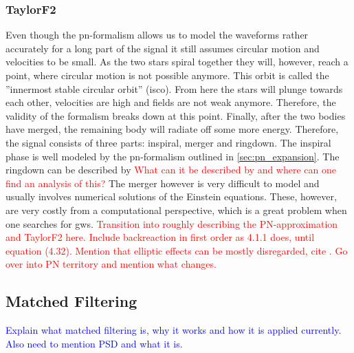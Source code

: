 \subsubsection{TaylorF2}
Even though the \gls{pn}-formalism allows us to model the waveforms rather accurately for a long part of the signal it still assumes circular motion and velocities to be small. As the two stars spiral together they will, however, reach a point, where circular motion is not possible anymore. This orbit is called the ''innermost stable circular orbit'' (\gls{isco}). From here the stars will plunge towards each other, velocities are high and fields are not weak anymore. Therefore, the validity of the formalism breaks down at this point. Finally, after the two bodies have merged, the remaining body will radiate off some more energy. Therefore, the signal consists of three parts: inspiral, merger and ringdown. The inspiral phase is well modeled by the \gls{pn}-formalism outlined in \autoref{sec:pn_expansion}. The ringdown can be described by \textcolor{red}{What can it be described by and where can one find an analysis of this?} The merger however is very difficult to model and usually involves numerical solutions of the Einstein equations. These, however, are very costly from a computational perspective, which is a great problem when one searches for \gls{gws}.
\textcolor{red}{Transition into roughly describing the PN-approximation and TaylorF2 here.}
\textcolor{red}{Include backreaction in first order as 4.1.1 \cite{gwv1} does, until equation (4.32). Mention that elliptic effects can be mostly disregarded, cite \cite{gwv1}. Go over into PN territory and mention what changes.}

\subsection{Matched Filtering}\label{sec:matched_filtering}
\textcolor{blue}{Explain what matched filtering is, why it works and how it is applied currently. Also need to mention PSD and what it is.}